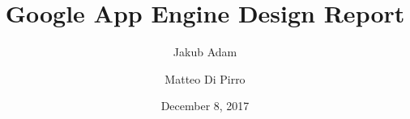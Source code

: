 \documentclass[a4paper,10pt]{article}
\begin{document}
\title{Google App Engine Design Report}
\author{Jakub Adam \and Matteo Di Pirro}
\date{December 8, 2017}

\maketitle



\newpage

\end{document}
